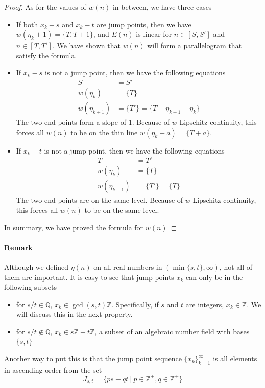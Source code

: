 \documentclass[]{article}
\begin{document}
\begin{proof}
	As for the values of $w(n)$ in between, we have three cases 
	\begin{itemize}
		\item If both $x_k-s$ and $x_k-t$ are jump points, then we have $w(\eta_k +1) =\{T, T+1\}$, and $E(n)$ is linear for $n \in [S, S']$ and $n \in [T, T']$. We have shown that $w(n)$ will form a parallelogram that satisfy the formula.
		\item If $x_k-s$ is not a jump point, then we have the following equations
		\begin{align*}
		S &= S'\\
		w(\eta_{k}) &= \{T\}\\
		w(\eta_{k+1}) &= \{T'\} = \{T+\eta_{k+1} - \eta_k\}
		\end{align*}
		The two end points form a slope of 1. Because of $w$-Lipschitz continuity, this forces all $w(n)$ to be on the thin line $w(\eta_{k} + a) = \{T+a\}$.
		\item If $x_k-t$ is not a jump point, then we have the following equations 
		\begin{align*}
		T &= T'\\
		w(\eta_{k}) &= \{T\}\\
		w(\eta_{k+1}) &= \{T'\} = \{T\}
		\end{align*}
		The two end points are on the same level. Because of $w$-Lipschitz continuity, this forces all $w(n)$ to be on the same level.
	\end{itemize}
	In summary, we have proved the formula for $w(n)$
	

\end{proof}

\paragraph{Remark}

Although we defined $\eta(n)$ on all real numbers in $(\min\{s, t\}, \infty)$, not all of them are important. It is easy to see that jump points $x_k$ can only be in the following subsets
\begin{itemize}
	\item for $s/t\in\mathbb{Q}$, $x_k \in \gcd(s,t)\mathbb{Z}$. Specifically, if $s$ and $t$ are integers, $x_k\in\mathbb{Z}$. We will discuss this in the next property.
	\item for $s/t\notin\mathbb{Q}$, $x_k \in s\mathbb{Z} + t\mathbb{Z}$, a subset of an algebraic number field with bases $\{s, t\}$
\end{itemize}
Another way to put this is that the jump point sequence $\{x_k\}_{k=1}^{\infty}$ is all elements in ascending order from the set
\[
	J_{s,t} = \{ps+qt\ |\  p \in \mathbb{Z}^+, q \in \mathbb{Z}^+\}
\]
\end{document}
